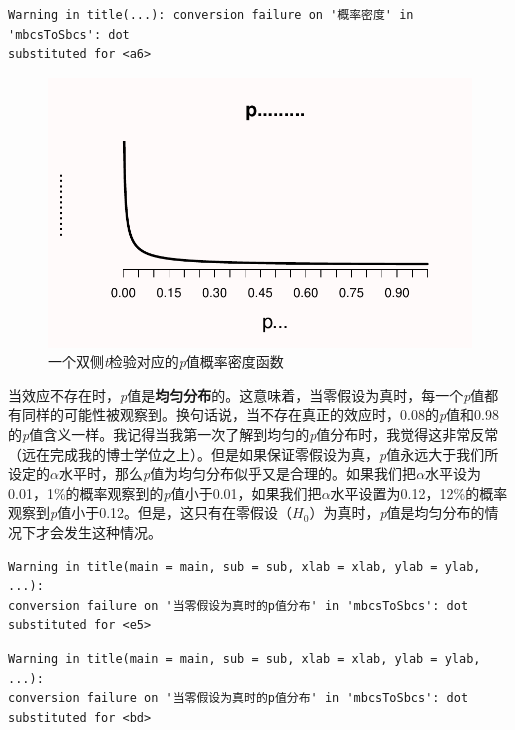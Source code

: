 \documentclass[
  letterpaper,
  DIV=11,
  numbers=noendperiod]{scrreprt}
\begin{document}
\begin{verbatim}
Warning in title(...): conversion failure on '概率密度' in 'mbcsToSbcs': dot
substituted for <a6>
\end{verbatim}

\begin{figure}

{\centering \includegraphics[width=1\textwidth,height=\textheight]{01-pvalue_files/figure-pdf/fig-pdft-1.pdf}

}

\caption{\label{fig-pdft}一个双侧\emph{t}检验对应的\emph{p}值概率密度函数}

\end{figure}

当效应不存在时，\emph{p}值是\textbf{均匀分布}的。这意味着，当零假设为真时，每一个\emph{p}值都有同样的可能性被观察到。换句话说，当不存在真正的效应时，0.08的\emph{p}值和0.98的\emph{p}值含义一样。我记得当我第一次了解到均匀的\emph{p}值分布时，我觉得这非常反常（远在完成我的博士学位之上）。但是如果保证零假设为真，\emph{p}值永远大于我们所设定的\(\alpha\)水平时，那么\emph{p}值为均匀分布似乎又是合理的。如果我们把\(\alpha\)水平设为0.01，1\%的概率观察到的\emph{p}值小于0.01，如果我们把\(\alpha\)水平设置为0.12，12\%的概率观察到\emph{p}值小于0.12。但是，这只有在零假设（\(H_0\)）为真时，\emph{p}值是均匀分布的情况下才会发生这种情况。

\begin{verbatim}
Warning in title(main = main, sub = sub, xlab = xlab, ylab = ylab, ...):
conversion failure on '当零假设为真时的p值分布' in 'mbcsToSbcs': dot
substituted for <e5>
\end{verbatim}

\begin{verbatim}
Warning in title(main = main, sub = sub, xlab = xlab, ylab = ylab, ...):
conversion failure on '当零假设为真时的p值分布' in 'mbcsToSbcs': dot
substituted for <bd>
\end{verbatim}
\end{document}
